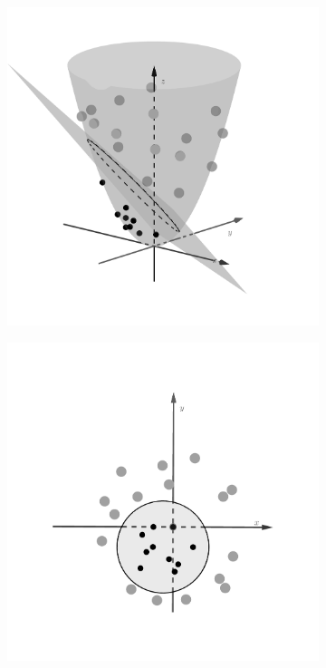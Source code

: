 \begin{figure}[t]
\begin{subfigure}{0.325\textwidth}
    \includegraphics[width=\linewidth]{Chapters/09_SupportVectorMachines/21_kernelsvm/52_gray.png} %
    \caption{}
    \end{subfigure}
    \begin{subfigure}{0.325\textwidth}
    \includegraphics[width=\linewidth]{Chapters/09_SupportVectorMachines/21_kernelsvm/62_gray.png} %
    \caption{}
    \end{subfigure}


\end{figure}
